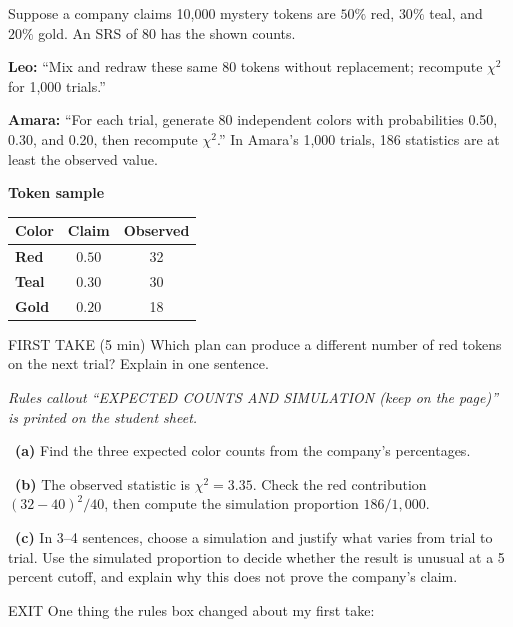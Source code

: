 \documentclass[11pt]{article}
\begin{document}
Suppose a company claims 10{,}000 mystery tokens are $50\%$ red, $30\%$ teal, and $20\%$ gold. An SRS of 80 has the shown counts.\par\smallskip \textbf{Leo:} ``Mix and redraw these same 80 tokens without replacement; recompute $\chi^2$ for 1,000 trials.''\par \textbf{Amara:} ``For each trial, generate 80 independent colors with probabilities 0.50, 0.30, and 0.20, then recompute $\chi^2$.'' In Amara's 1,000 trials, 186 statistics are at least the observed value.\par
\begin{center}
\textbf{Token sample}\par\smallskip
\begin{tabular}{|l|c|c|}
\hline
\textbf{Color} & \textbf{Claim} & \textbf{Observed} \\ \hline
\textbf{Red} & $0.50$ & 32 \\ \hline
\textbf{Teal} & $0.30$ & 30 \\ \hline
\textbf{Gold} & $0.20$ & 18 \\ \hline
\end{tabular}
\end{center}
\begin{firsttakebox}{FIRST TAKE (5 min)}
Which plan can produce a different number of red tokens on the next trial? Explain in one sentence.\par
{}
\end{firsttakebox}

\textit{Rules callout ``EXPECTED COUNTS AND SIMULATION (keep on the page)'' is printed on the student sheet.}\par\medskip

~\textbf{(a)} Find the three expected color counts from the company's percentages.\par
{}

~\textbf{(b)} The observed statistic is $\chi^2=3.35$. Check the red contribution $(32-40)^2/40$, then compute the simulation proportion $186/1{,}000$.\par
{}

~\textbf{(c)} In 3--4 sentences, choose a simulation and justify what varies from trial to trial. Use the simulated proportion to decide whether the result is unusual at a 5 percent cutoff, and explain why this does not prove the company's claim.\par
{}

\begin{summaryexitbox}{EXIT}
One thing the rules box changed about my first take: \hrulefill
\end{summaryexitbox}
\end{document}
